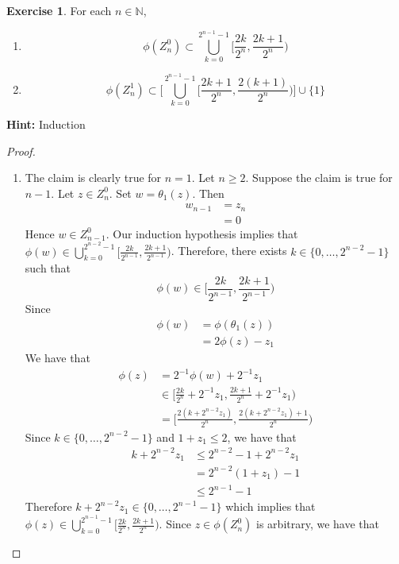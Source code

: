 \documentclass{book}
\theoremstyle{definition}
\newtheorem{ex}[definition]{Exercise}
\newcommand{\N}{\mathbb{N}}
\newcommand{\lex}[1]{\label{ex:#1}}
\DeclareMathOperator*{\0}{\mbf{0}}
\DeclareMathOperator*{\1}{\mbf{1}}
\newcommand{\tbf}[1]{\textbf{#1}}
\begin{document}
	
	\begin{ex} \lex{28005.1} 
		For each $n \in \N$, 
		\begin{enumerate}
			\item $$\phi(Z_n^0) \subset \bigcup\limits_{k =0}^{2^{n-1} -1} \bigg[ \frac{2k}{2^n}, \frac{2k+1}{2^n} \bigg)$$
			\item $$\phi(Z_n^1) \subset \bigg[ \bigcup\limits_{k =0}^{2^{n-1} -1} \bigg[ \frac{2k + 1}{2^n}, \frac{2(k+1)}{2^n} \bigg) \bigg] \cup \{1\}$$
		\end{enumerate}
		\tbf{Hint:} Induction
	\end{ex}
	
	\begin{proof}\
		\begin{enumerate}
			\item The claim is clearly true for $n = 1$. Let $n \geq 2$. Suppose the claim is true for $n-1$. Let $z \in Z_n^0$. Set $w = \theta_1 (z)$. 
			Then 
			\begin{align*}
				w_{n-1} 
				& = z_n \\
				& = 0
			\end{align*}
			Hence $w \in Z_{n-1}^0$. Our induction hypothesis implies that $\phi(w) \in \bigcup\limits_{k =0}^{2^{n-2} -1} \bigg[ \frac{2k}{2^{n-1}}, \frac{2k+1}{2^{n-1}} \bigg)$.
			Therefore, there exists $k \in \{0, \ldots, 2^{n-2} -1\}$ such that $$\phi(w) \in \bigg[ \frac{2k}{2^{n-1}}, \frac{2k+1}{2^{n-1}} \bigg)$$ Since 
			\begin{align*}
				\phi(w) 
				& = \phi(\theta_1(z)) \\
				& = 2 \phi(z) - z_1
			\end{align*}
			We have that
			\begin{align*}
				\phi(z) 
				& = 2^{-1}\phi(w) + 2^{-1} z_1 \\
				& \in \bigg[ \frac{2k}{2^n} + 2^{-1}z_1, \frac{2k + 1}{2^n} +  2^{-1}z_1 \bigg) \\
				& = \bigg[ \frac{2(k+ 2^{n-2}z_1)}{2^n}, \frac{2(k+ 2^{n-2}z_1) + 1}{2^n} \bigg) 
			\end{align*}
			Since $k \in \{0, \ldots, 2^{n-2} -1\}$ and $1 + z_1 \leq 2$, we have that 
			\begin{align*}
				k+ 2^{n-2}z_1 
				& \leq 2^{n-2} -1 + 2^{n-2}z_1  \\
				&  =  2^{n-2}(1 + z_1) - 1 \\
				& \leq 2^{n-1} - 1
			\end{align*} 
			Therefore $	k+ 2^{n-2}z_1 \in \{0, \ldots, 2^{n-1} - 1\}$ which implies that $\phi(z) \in  \bigcup\limits_{k =0}^{2^{n-1} -1} \bigg[ \frac{2k}{2^n}, \frac{2k+1}{2^n} \bigg)$. Since $z \in \phi(Z_n^0)$ is arbitrary, we have that

\end{enumerate}
\end{proof}
\end{document}

